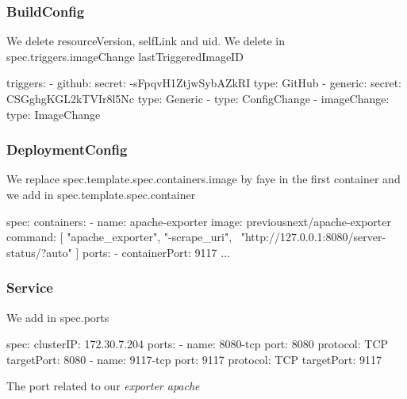 \documentclass{beamer}
\begin{document}
\begin{frame}[fragile]
  \frametitle{BuildConfig}
  We delete resourceVersion, selfLink and uid. We delete in spec.triggers.imageChange lastTriggeredImageID
  \begin{yamlcode}
    triggers:                                                                                                       
    - github:                                                                                                       
        secret: -sFpqvH1ZtjwSybAZkRI                                                                                
      type: GitHub                                                                                                  
    - generic:                                                                                                      
      secret: CSGghgKGL2kTVIr8l5Nc                                                                                
      type: Generic                                                                                                 
    - type: ConfigChange                                                                                            
    - imageChange:                                                                                                  
      type: ImageChange
  \end{yamlcode}
\end{frame}

\begin{frame}[fragile]
  \frametitle{DeploymentConfig}
  We replace spec.template.spec.containers.image by faye in the first container and we add in spec.template.spec.container
  \begin{yamlcode}
    spec:
      containers: 
      - name: apache-exporter
      image: previousnext/apache-exporter
      command: [ "apache_exporter", "-scrape_uri", \
      "http://127.0.0.1:8080/server-status/?auto" ]
      ports:
      - containerPort: 9117
      ...
  \end{yamlcode}
\end{frame}

\begin{frame}[fragile]
  \frametitle{Service}
  We add in spec.ports
  \begin{yamlcode}
    spec:                                                                                                             
      clusterIP: 172.30.7.204                                                                                         
      ports:                                                                                                          
      - name: 8080-tcp                                                                                                
      port: 8080                                                                                                    
      protocol: TCP                                                                                                 
      targetPort: 8080 
      - name: 9117-tcp
      port: 9117
      protocol: TCP
      targetPort: 9117
  \end{yamlcode}
  The port related to our \emph{exporter apache}
\end{frame}
\end{document}
